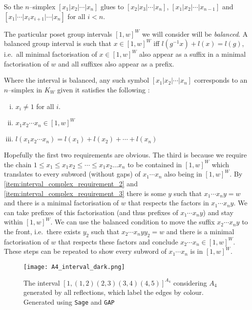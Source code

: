 \documentclass[class=article, crop=false]{standalone}
\begin{document}
So the $n$--simplex $[x_1 | x_2 | \cdots | x_n]$ glues to $[x_2|x_3|\cdots|x_n]$, $[x_1|x_2|\cdots|x_{n-1}]$ and \newline $[x_1| \cdots | x_ix_{i+1} | \cdots |x_n]$ for all $i<n$.

The particular poset group intervals $[1,w]^W$ we will consider will be \emph{balanced}. A balanced group interval is such that  $x \in [1,w]^W$ iff $l(g^{-1}x) + l(x) = l(g)$, i.e.~all minimal factorisation of $x \in [1,w]^W$ also appear as a suffix in a minimal factorisation of $w$ and all suffixes also appear as a prefix.

Where the interval is balanced, any such symbol  $[x_1 | x_2 | \cdots | x_n]$ corresponds to an $n$--simplex in $K_{W}$ given it satisfies the following \cite[Definition 2.8]{paolini_salvetti_kpi1_2021}:
\begin{enumerate}[i)]
    \item \label{item:interval_complex_requirement_1} $x_i \neq 1$ for all $i$.
    \item \label{item:interval_complex_requirement_2} $x_1 x_2 \cdots x_n \in [1,w]^W$
    \item \label{item:interval_complex_requirement_3} $l(x_1x_2\cdots x_n) = l(x_1) + l(x_2) + \cdots + l(x_n)$ 
\end{enumerate}

Hopefully the first two requirements are obvious. The third is because we require the chain $1 \leq x_1 \leq x_1x_2 \leq \cdots \leq x_1x_2\ldots x_{n}$ to be contained in $[1,w]^W$ which translates to every subword (without gaps) of $x_1\cdots x_n$ also being in $[1,w]^W$. By \eqref{item:interval_complex_requirement_2} and \eqref{item:interval_complex_requirement_3} there is some $y$ such that $x_1 \cdots x_n y = w$ and there is a minimal factorisation of $w$ that respects the factors in $ x_1 \cdots x_n y$.
We can take prefixes of this factorisation (and thus prefixes of $ x_1 \cdots x_n y$) and stay within $[1,w]^W$. We can use the balanced condition to move the suffix $x_2\cdots x_n y$ to the front, i.e.~there exists $y_2$ such that $x_2\cdots x_n yy_2=w$ and there is a minimal factorisation of $w$ that respects these factors and conclude $x_2\cdots x_n \in [1,w]^W$. These steps can be repeated to show every subword of $x_1 \cdots x_n $ is in $[1,w]^W$.

\begin{figure}
	\centering
	\texttt{[image: A4\_interval\_dark.png]}
	\caption{The interval $[1, (1,2)(2,3)(3,4)(4,5)]^{A_4}$ considering $A_4$ generated by all reflections, which label the edges by colour. Generated using \texttt{Sage} and \texttt{GAP} \cite{sagemath_2020, gap_2022}}
	\label{fig:A4_interval}
\end{figure}
\end{document}
